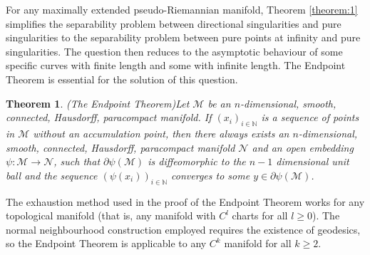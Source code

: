 \documentclass[pdflatex,sn-mathphys-num]{sn-jnl}
\newcommand{\Junbang}[1]{{\color{magenta}#1}}
\newtheorem{theorem}{Theorem}[section]
\theoremstyle{definition}
\begin{document}
For any maximally extended pseudo-Riemannian manifold, Theorem \ref{theorem:1} simplifies the separability problem between directional singularities and pure singularities to the separability problem between pure points at infinity and pure singularities. The question then reduces to the asymptotic behaviour of some specific curves with finite length and some with infinite length.
The Endpoint Theorem \cite{Scott_2021} is essential for the solution of this question.
\begin{theorem}(The Endpoint Theorem)\label{theorem:endpoint}
    Let $\mathcal{M}$ be an $n$-dimensional, smooth, connected, Hausdorff, paracompact manifold. If $(x_i)_{i \in \mathbb{N}}$ is a sequence of points in $\mathcal{M}$ without an accumulation point, then there always exists an $n$-dimensional, smooth, connected, Hausdorff, paracompact manifold $\mathcal{N}$ and an open embedding $\psi : \mathcal{M} \rightarrow \mathcal{N}$, such that $\partial\psi(\mathcal{M})$ is diffeomorphic to the $n-1$ dimensional unit ball and the sequence $(\psi(x_i))_{i \in \mathbb{N}}$ converges to some $y \in \partial\psi(\mathcal{M})$.
\end{theorem}

The exhaustion method used in the proof of the Endpoint Theorem \cite{Scott_2021} works for any topological manifold (that is, any manifold with $C^l$ charts for all $l \geq 0$). The normal neighbourhood construction employed requires the existence of geodesics, so the Endpoint Theorem is applicable to any $C^k$ manifold for all $k \geq 2$.\\
\end{document}

